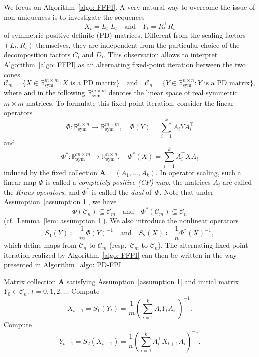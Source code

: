 \documentclass[a4paper]{article}
\newcommand{\R}{\mathbb{R}}
\newcommand{\bA}{\mathbf{A}}
\newcommand{\caC}{\mathcal{C}}
\theoremstyle{definition}
\numberwithin{equation}{section}
\begin{document}
We focus on Algorithm~\ref{algo: FFPI}. A very natural way to overcome the issue of non-uniqueness is to investigate the sequences
\[
 X_t = L_t^\top L_t^{} \quad \text{and} \quad  Y_t = R_t^\top R_t^{}
\]
of symmetric positive definite (PD) matrices. Different from the scaling factors $(L_t,R_t)$ themselves, they are independent from the particular choice of the decomposition factors $C_t$ and $D_t$. This observation allows to interpret Algorithm~\ref{algo: FFPI} as an alternating fixed-point iteration between the two cones
\[
 \caC_m = \{ X \in \R^{m \times m}_{\mathrm{sym}} : \text{$X$ is a PD matrix} \} \quad \text{and} \quad \caC_n = \{ Y \in \R^{n \times n}_{\mathrm{sym}} : \text{$Y$ is a PD matrix} \},
\]
where and in the following $\R^{m \times m}_{\mathrm{sym}}$ denotes the linear space of real symmetric $m \times m$ matrices. To formulate this fixed-point iteration, consider the linear operators
\[
 \Phi : \R^{n \times n}_{\mathrm{sym}} \to \R^{m \times m}_{\mathrm{sym}}, \quad \Phi(Y) = \sum_{i=1}^k A_i Y A_i^\top
\]
and
\[
 \Phi^* : \R^{m \times m}_{\mathrm{sym}} \to \R^{n \times n}_{\mathrm{sym}}, \quad \Phi^* (X) = \sum_{i=1}^k A_i^\top X A_i^{}
\]
induced by the fixed collection $\bA = (A_1,\dots,A_k)$. In operator scaling, such a linear map $\Phi$ is called a \emph{completely positive (CP) map}, the matrices $A_i$ are called the \emph{Kraus operators}, and $\Phi^*$ is called the \emph{dual} of~$\Phi$.
Note that under Assumption~\ref{assumption 1}, we have
\[
\Phi(\caC_n) \subseteq \caC_m \quad \text{and} \quad \Phi^*(\caC_m) \subseteq \caC_n 
\]
(cf.~Lemma~\ref{lem: assumption 1}). We also introduce the nonlinear operators
\begin{equation}\label{eq: operators S1 and S2}
S_1(Y) \coloneqq \frac{1}{m} \Phi(Y)^{-1} \quad \text{and} \quad S_2(X) \coloneqq \frac{1}{n} \Phi^*(X)^{-1},
\end{equation}
which define maps from $\caC_n$ to $\caC_m$ (resp.~$\caC_m$ to $\caC_n$). The alternating fixed-point iteration realized by Algorithm~\ref{algo: FFPI} can then be written in the way presented in Algorithm~\ref{algo: PD-FPI}.

\begin{algorithm}[t]
\small
\caption{Fixed-Point Iteration on PD Cones}
\label{algo: PD-FPI}
\begin{algorithmic}[1]
\Input
Matrix collection $\bA$ satisfying Assumption~\ref{assumption 1} and initial matrix $Y_0 \in \caC_n$.
\For
{$t = 0,1,2,\dots$}
    \State
    Compute
    \[
    X_{t+1} = S_1(Y_t) = \frac{1}{m} \left(\sum_{i=1}^k A_i Y_t A_i^\top \right)^{-1}.  %
    \]
    \State
    Compute
    \[
    Y_{t+1} = S_2(X_{t+1}) = \frac{1}{n} \left(\sum_{i=1}^k A_i^\top X_{t+1} A_i \right)^{-1}.
    \]
\EndFor
\end{algorithmic}
\end{algorithm}
\end{document}
